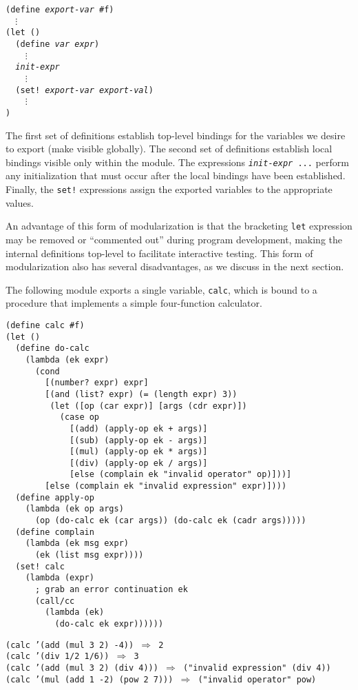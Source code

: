 \begin{alltt}
(define \textit{export-var} \#{}f)
  \(\vdots\)
(let ()
  (define \textit{var} \textit{expr})
    \(\vdots\)
  \textit{init-expr}
    \(\vdots\)
  (set! \textit{export-var} \textit{export-val})
    \(\vdots\)
)
\end{alltt}


The first set of definitions establish top-level bindings for the
variables we desire to export (make visible globally).
The second set of definitions establish local bindings visible only
within the module.
The expressions \texttt{\textit{init-expr} ...} perform any initialization that
must occur after the local bindings have been established.
Finally, the \texttt{set!} expressions assign the exported variables to
the appropriate values.


An advantage of this form of modularization is that the bracketing
\texttt{let} expression may be removed or ``commented out'' during
program development, making the internal definitions top-level to
facilitate interactive testing.
This form of modularization also has several disadvantages, as we
discuss in the next section.


The following module exports a single variable, \texttt{calc}, which is
bound to a procedure that implements a simple four-function
calculator.


\begin{alltt}
(define calc \#{}f)
(let ()
  (define do-calc
    (lambda (ek expr)
      (cond
        [(number? expr) expr]
        [(and (list? expr) (= (length expr) 3))
         (let ([op (car expr)] [args (cdr expr)])
           (case op
             [(add) (apply-op ek + args)]
             [(sub) (apply-op ek - args)]
             [(mul) (apply-op ek * args)]
             [(div) (apply-op ek / args)]
             [else (complain ek "invalid operator" op)]))]
        [else (complain ek "invalid expression" expr)])))
  (define apply-op
    (lambda (ek op args)
      (op (do-calc ek (car args)) (do-calc ek (cadr args)))))
  (define complain
    (lambda (ek msg expr)
      (ek (list msg expr))))
  (set! calc
    (lambda (expr)
      ; grab an error continuation ek
      (call/cc
        (lambda (ek)
          (do-calc ek expr))))))

(calc '(add (mul 3 2) -4)) \(\Rightarrow\) 2
(calc '(div 1/2 1/6)) \(\Rightarrow\) 3
(calc '(add (mul 3 2) (div 4))) \(\Rightarrow\) ("invalid expression" (div 4))
(calc '(mul (add 1 -2) (pow 2 7))) \(\Rightarrow\) ("invalid operator" pow)
\end{alltt}


